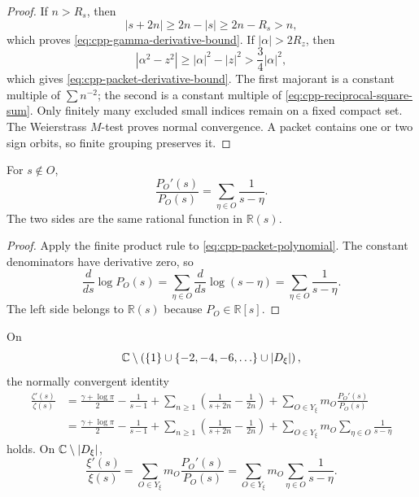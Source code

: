 \begin{proof}
If \(n>R_s\), then
\[
 |s+2n|\geq2n-|s|\geq2n-R_s>n,
\]
which proves \eqref{eq:cpp-gamma-derivative-bound}.  If
\(|\alpha|>2R_z\), then
\[
 |\alpha^2-z^2|
 \geq|\alpha|^2-|z|^2
 >
 \frac34|\alpha|^2,
\]
which gives \eqref{eq:cpp-packet-derivative-bound}.  The first majorant is a
constant multiple of \(\sum n^{-2}\); the second is a constant multiple of
\eqref{eq:cpp-reciprocal-square-sum}.  Only finitely many excluded small
indices remain on a fixed compact set.  The Weierstrass \(M\)-test proves
normal convergence.  A packet contains one or two sign orbits, so finite
grouping preserves it.
\end{proof}

\begin{proposition}
\label{prop:cpp-one-packet-log-derivative}
For \(s\notin O\),
\begin{equation}
\label{eq:cpp-one-packet-log-derivative}
 \frac{P_O'(s)}{P_O(s)}
 =
 \sum_{\eta\in O}\frac1{s-\eta}.
\end{equation}
The two sides are the same rational function in \(\mathbb R(s)\).
\end{proposition}

\begin{proof}
Apply the finite product rule to
\eqref{eq:cpp-packet-polynomial}.  The constant denominators have derivative
zero, so
\[
 \frac{d}{ds}\log P_O(s)
 =
 \sum_{\eta\in O}\frac{d}{ds}\log(s-\eta)
 =
 \sum_{\eta\in O}\frac1{s-\eta}.
\]
The left side belongs to \(\mathbb R(s)\) because \(P_O\in\mathbb R[s]\).
\end{proof}

\begin{theorem}
\label{thm:cpp-zeta-log-derivative}
On
\[
 \mathbb C\setminus
 \left(
 \{1\}\cup\{-2,-4,-6,\ldots\}\cup|D_\xi|
 \right),
\]
the normally convergent identity
\begin{align}
\label{eq:cpp-zeta-log-derivative}
 \frac{\zeta'(s)}{\zeta(s)}
 &=
 \frac{\gamma+\log\pi}{2}
 -\frac1{s-1}
 +\sum_{n\geq1}
 \left(\frac1{s+2n}-\frac1{2n}\right)
 +\sum_{O\in Y_\xi}
 m_O\frac{P_O'(s)}{P_O(s)}\\
\label{eq:cpp-zeta-log-derivative-expanded}
 &=
 \frac{\gamma+\log\pi}{2}
 -\frac1{s-1}
 +\sum_{n\geq1}
 \left(\frac1{s+2n}-\frac1{2n}\right)
 +\sum_{O\in Y_\xi}
 m_O\sum_{\eta\in O}\frac1{s-\eta}
\end{align}
holds.  On \(\mathbb C\setminus|D_\xi|\),
\begin{equation}
\label{eq:cpp-xi-log-derivative}
 \frac{\xi'(s)}{\xi(s)}
 =
 \sum_{O\in Y_\xi}
 m_O\frac{P_O'(s)}{P_O(s)}
 =
 \sum_{O\in Y_\xi}
 m_O\sum_{\eta\in O}\frac1{s-\eta}.
\end{equation}
\end{theorem}

